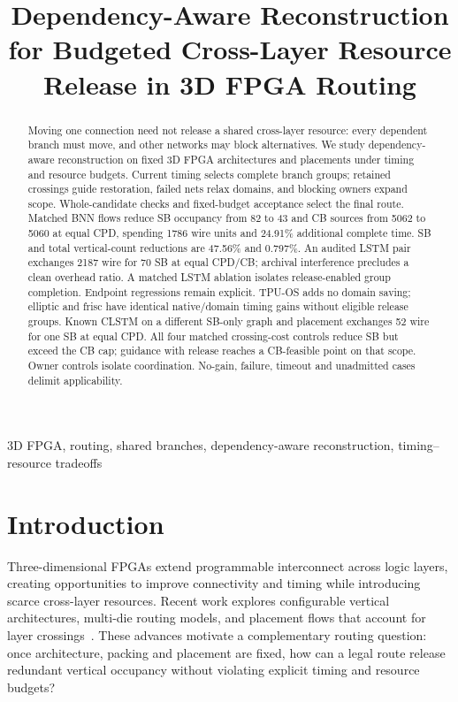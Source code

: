 \documentclass[conference,10pt]{IEEEtran}
\title{Dependency-Aware Reconstruction for Budgeted Cross-Layer Resource Release in 3D FPGA Routing}
\author{\IEEEauthorblockN{Anonymous submission}}
\begin{document}
\maketitle
\begin{abstract}
Moving one connection need not release a shared cross-layer resource: every dependent branch must move, and other networks may block alternatives. We study dependency-aware reconstruction on fixed 3D FPGA architectures and placements under timing and resource budgets. Current timing selects complete branch groups; retained crossings guide restoration, failed nets relax domains, and blocking owners expand scope. Whole-candidate checks and fixed-budget acceptance select the final route. Matched BNN flows reduce SB occupancy from 82 to 43 and CB sources from 5062 to 5060 at equal CPD, spending 1786 wire units and 24.91\% additional complete time. SB and total vertical-count reductions are 47.56\% and 0.797\%. An audited LSTM pair exchanges 2187 wire for 70 SB at equal CPD/CB; archival interference precludes a clean overhead ratio. A matched LSTM ablation isolates release-enabled group completion. Endpoint regressions remain explicit. TPU-OS adds no domain saving; elliptic and frisc have identical native/domain timing gains without eligible release groups. Known CLSTM on a different SB-only graph and placement exchanges 52 wire for one SB at equal CPD. All four matched crossing-cost controls reduce SB but exceed the CB cap; guidance with release reaches a CB-feasible point on that scope. Owner controls isolate coordination. No-gain, failure, timeout and unadmitted cases delimit applicability.
\end{abstract}
\begin{IEEEkeywords}
3D FPGA, routing, shared branches, dependency-aware reconstruction, timing--resource tradeoffs
\end{IEEEkeywords}

\section{Introduction}
Three-dimensional FPGAs extend programmable interconnect across logic layers, creating opportunities to improve connectivity and timing while introducing scarce cross-layer resources. Recent work explores configurable vertical architectures, multi-die routing models, and placement flows that account for layer crossings~\cite{lazagna,multidie,flatland}. These advances motivate a complementary routing question: once architecture, packing and placement are fixed, how can a legal route release redundant vertical occupancy without violating explicit timing and resource budgets?
\end{document}
